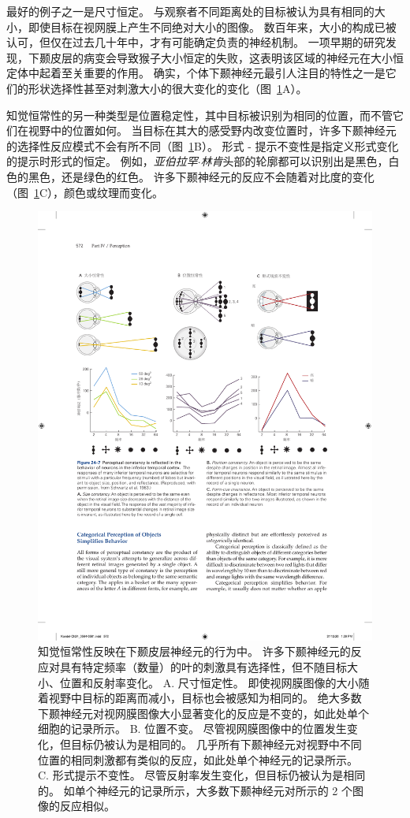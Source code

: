 最好的例子之一是尺寸恒定。
与观察者不同距离处的目标被认为具有相同的大小，即使目标在视网膜上产生不同绝对大小的图像。
数百年来，大小的构成已被认可，但仅在过去几十年中，才有可能确定负责的神经机制。
一项早期的研究发现，下颞皮层的病变会导致猴子大小恒定的失败，这表明该区域的神经元在大小恒定体中起着至关重要的作用。
确实，个体下颞神经元最引人注目的特性之一是它们的形状选择性甚至对刺激大小的很大变化的变化（图~\ref{fig:24_7}A）。


知觉恒常性的另一种类型是位置稳定性，其中目标被识别为相同的位置，而不管它们在视野中的位置如何。
当目标在其大的感受野内改变位置时，许多下颞神经元的选择性反应模式不会有所不同（图~\ref{fig:24_7}B）。
形式 - 提示不变性是指定义形式变化的提示时形式的恒定。
例如，\textit{亚伯拉罕$\cdot$林肯}头部的轮廓都可以识别出是黑色，白色的黑色，还是绿色的红色。 
许多下颞神经元的反应不会随着对比度的变化（图~\ref{fig:24_7}C），颜色或纹理而变化。


\begin{figure}[htbp]
	\centering
	\includegraphics[width=1.0\linewidth]{chap24/fig_24_7}
	\caption{知觉恒常性反映在下颞皮层神经元的行为中。
		许多下颞神经元的反应对具有特定频率（数量）的叶的刺激具有选择性，但不随目标大小、位置和反射率变化。
		A. 尺寸恒定性。
		即使视网膜图像的大小随着视野中目标的距离而减小，目标也会被感知为相同的。
		绝大多数下颞神经元对视网膜图像大小显著变化的反应是不变的，如此处单个细胞的记录所示。
		B. 位置不变。
		尽管视网膜图像中的位置发生变化，但目标仍被认为是相同的。
		几乎所有下颞神经元对视野中不同位置的相同刺激都有类似的反应，如此处单个神经元的记录所示。
		C. 形式提示不变性。
		尽管反射率发生变化，但目标仍被认为是相同的。
		如单个神经元的记录所示，大多数下颞神经元对所示的 2 个图像的反应相似。}
	\label{fig:24_7}
\end{figure}


